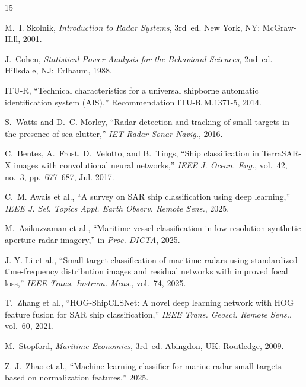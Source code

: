 \documentclass[journal]{IEEEtran}
\begin{document}

\begin{thebibliography}{15}

M.~I. Skolnik, \textit{Introduction to Radar Systems}, 3rd~ed. New York, NY: McGraw-Hill, 2001.

J.~Cohen, \textit{Statistical Power Analysis for the Behavioral Sciences}, 2nd~ed. Hillsdale, NJ: Erlbaum, 1988.

ITU-R, ``Technical characteristics for a universal shipborne automatic identification system (AIS),'' Recommendation ITU-R M.1371-5, 2014.

S.~Watts and D.~C. Morley, ``Radar detection and tracking of small targets in the presence of sea clutter,'' \textit{IET Radar Sonar Navig.}, 2016.

C.~Bentes, A.~Frost, D.~Velotto, and B.~Tings, ``Ship classification in TerraSAR-X images with convolutional neural networks,'' \textit{IEEE J. Ocean. Eng.}, vol.~42, no.~3, pp.~677--687, Jul. 2017.

C.~M. Awais et al., ``A survey on SAR ship classification using deep learning,'' \textit{IEEE J. Sel. Topics Appl. Earth Observ. Remote Sens.}, 2025.

M.~Asikuzzaman et al., ``Maritime vessel classification in low-resolution synthetic aperture radar imagery,'' in \textit{Proc. DICTA}, 2025.

J.-Y. Li et al., ``Small target classification of maritime radars using standardized time-frequency distribution images and residual networks with improved focal loss,'' \textit{IEEE Trans. Instrum. Meas.}, vol.~74, 2025.

T.~Zhang et al., ``HOG-ShipCLSNet: A novel deep learning network with HOG feature fusion for SAR ship classification,'' \textit{IEEE Trans. Geosci. Remote Sens.}, vol.~60, 2021.

M.~Stopford, \textit{Maritime Economics}, 3rd~ed. Abingdon, UK: Routledge, 2009.

Z.-J.~Zhao et al., ``Machine learning classifier for marine radar small targets based on normalization features,'' 2025.

\end{thebibliography}
\end{document}
